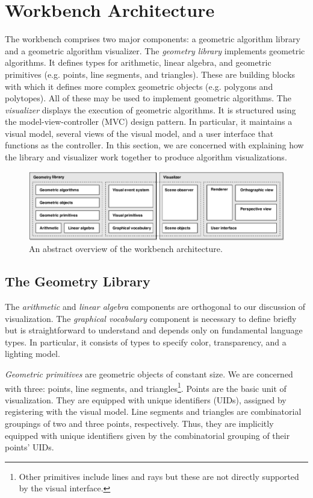 
\FloatBarrier
\section{Workbench Architecture}
\label{sec:workbench-architecture}

The workbench comprises two major components: a geometric algorithm library and
a geometric algorithm visualizer. The \emph{geometry library} implements
geometric algorithms. It defines types for arithmetic, linear algebra, and
geometric primitives (e.g. points, line segments, and triangles). These are
building blocks with which it defines more complex geometric objects (e.g.
polygons and polytopes). All of these may be used to implement geometric
algorithms. The \emph{visualizer} displays the execution of geometric
algorithms. It is structured using the model-view-controller (MVC) design
pattern. In particular, it maintains a visual model, several views of the visual
model, and a user interface that functions as the controller. In this section,
we are concerned with explaining how the library and visualizer work together to
produce algorithm visualizations.

\begin{figure}[htb]
\centering
\includegraphics[width=\textwidth]{figures/components-uml-5} 
\caption{An abstract overview of the workbench architecture.}
\label{fig:components} 
\end{figure}

\subsection{The Geometry Library}

The \emph{arithmetic} and \emph{linear algebra} components are orthogonal to our
discussion of visualization. The \emph{graphical vocabulary} component is
necessary to define briefly but is straightforward to understand and depends
only on fundamental language types. In particular, it consists of types to
specify color, transparency, and a lighting model.

\emph{Geometric primitives} are geometric objects of constant size. We are
concerned with three: points, line segments, and triangles\footnote{Other
primitives include lines and rays but these are not directly supported by the
visual interface.}. Points are the basic unit of visualization. They are
equipped with unique identifiers (UIDs), assigned by registering with the visual
model. Line segments and triangles are combinatorial groupings of two and three
points, respectively. Thus, they are implicitly equipped with unique identifiers
given by the combinatorial grouping of their points' UIDs.

